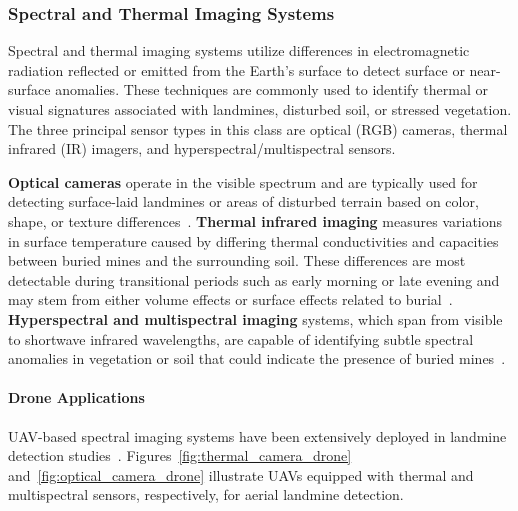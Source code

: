 \subsubsection{Spectral and Thermal Imaging Systems}

Spectral and thermal imaging systems utilize differences in electromagnetic radiation reflected or emitted from the Earth's surface to detect surface or near-surface anomalies. These techniques are commonly used to identify thermal or visual signatures associated with landmines, disturbed soil, or stressed vegetation. The three principal sensor types in this class are optical (RGB) cameras, thermal infrared (IR) imagers, and hyperspectral/multispectral sensors.

\textbf{Optical cameras} operate in the visible spectrum and are typically used for detecting surface-laid landmines or areas of disturbed terrain based on color, shape, or texture differences~\cite{cardonalandmine}. \textbf{Thermal infrared imaging} measures variations in surface temperature caused by differing thermal conductivities and capacities between buried mines and the surrounding soil. These differences are most detectable during transitional periods such as early morning or late evening and may stem from either volume effects or surface effects related to burial~\cite{Bruschini1997ASO,paik2002image,hutsul2024review}. \textbf{Hyperspectral and multispectral imaging} systems, which span from visible to shortwave infrared wavelengths, are capable of identifying subtle spectral anomalies in vegetation or soil that could indicate the presence of buried mines~\cite{robledo2009survey,alqudsi2021review}.

\paragraph{Drone Applications} UAV-based spectral imaging systems have been extensively deployed in landmine detection studies~\cite{dena2020image,10.1117/12.2177182,Popov2022MethodFM,rs15040967,Baur2021HowTI,baur2020applying,AgrawalChung2024ComparingSL,10765909,6842242,rs16122046,qiu2023joint,ptsa-qj43-23,TENORIOTAMAYO2023109443,nikulin2018detection,FORERORAMIREZ2022104307,TENORIOTAMAYO2024105567,krause2018diurnal,Fardoulis2020PROOFHS,butt2024uav}. Figures~\ref{fig:thermal_camera_drone} and~\ref{fig:optical_camera_drone} illustrate UAVs equipped with thermal and multispectral sensors, respectively, for aerial landmine detection.

